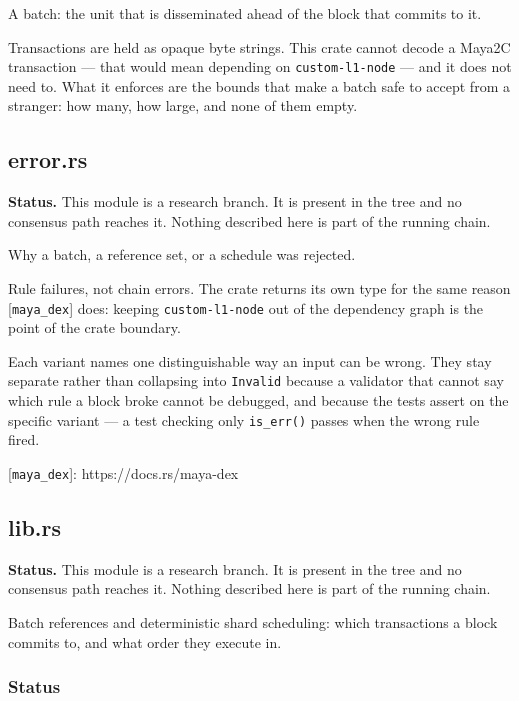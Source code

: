 \documentclass[11pt,a4paper]{article}
\begin{document}
A batch: the unit that is disseminated ahead of the block that commits to
it.

Transactions are held as opaque byte strings. This crate cannot decode a
Maya2C transaction — that would mean depending on \texttt{custom-l1-node} — and it
does not need to. What it enforces are the bounds that make a batch safe to
accept from a stranger: how many, how large, and none of them empty.

\subsection{error.rs}
\begin{framed}\noindent\textbf{Status.} This module is a research branch. It is present in the tree and no consensus path reaches it. Nothing described here is part of the running chain.\end{framed}

Why a batch, a reference set, or a schedule was rejected.

Rule failures, not chain errors. The crate returns its own type for the same
reason [\texttt{maya\_dex}] does: keeping \texttt{custom-l1-node} out of the dependency
graph is the point of the crate boundary.

Each variant names one distinguishable way an input can be wrong. They stay
separate rather than collapsing into \texttt{Invalid} because a validator that
cannot say which rule a block broke cannot be debugged, and because the tests
assert on the specific variant — a test checking only \texttt{is\_err()} passes when
the wrong rule fired.

[\texttt{maya\_dex}]: https://docs.rs/maya-dex

\subsection{lib.rs}
\begin{framed}\noindent\textbf{Status.} This module is a research branch. It is present in the tree and no consensus path reaches it. Nothing described here is part of the running chain.\end{framed}

Batch references and deterministic shard scheduling: which transactions a
block commits to, and what order they execute in.

\subsubsection{Status}
\end{document}
